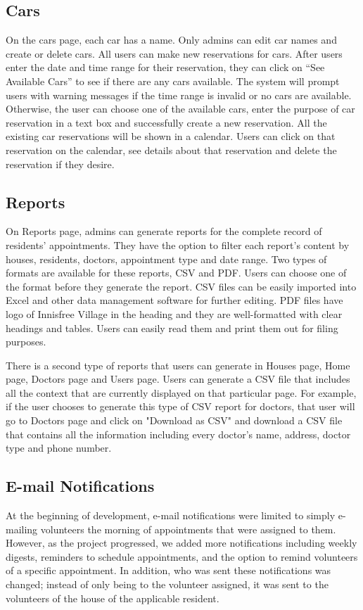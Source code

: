\documentclass{sig-alternate}
\begin{document}
\subsection{Cars}
On the cars page, each car has a name. Only admins can edit car names and create or delete cars. All users can make new reservations for cars. After users enter the date and time range for their reservation, they can click on “See Available Cars” to see if there are any cars available. The system will prompt users with warning messages if the time range is invalid or no cars are available. Otherwise, the user can choose one of the available cars, enter the purpose of car reservation in a text box and successfully create a new reservation. All the existing car reservations will be shown in a calendar. Users can click on that reservation on the calendar, see details about that reservation and delete the reservation if they desire. 

\subsection{Reports}
On Reports page, admins can generate reports for the complete record of residents' appointments. They have the option to filter each report's content by houses, residents, doctors, appointment type and date range. Two types of formats are available for these reports, CSV and PDF. Users can choose one of the format before they generate the report. CSV files can be easily imported into Excel and other data management software for further editing. PDF files have logo of Innisfree Village in the heading and they are well-formatted with clear headings and tables. Users can easily read them and print them out for filing purposes. 

There is a second type of reports that users can generate in Houses page, Home page, Doctors page and Users page. Users can generate a CSV file that includes all the context that are currently displayed on that particular page. For example, if the user chooses to generate this type of CSV report for doctors, that user will go to Doctors page and click on "Download as CSV" and download a CSV file that contains all the information including every doctor's name, address, doctor type and phone number. 

\subsection{E-mail Notifications}
At the beginning of development, e-mail notifications were limited to simply e-mailing volunteers the morning of appointments that were assigned to them.  However, as the project progressed, we added more notifications including weekly digests, reminders to schedule appointments, and the option to remind volunteers of a specific appointment.  In addition, who was sent these notifications was changed; instead of only being to the volunteer assigned, it was sent to the volunteers of the house of the applicable resident.
\end{document}
